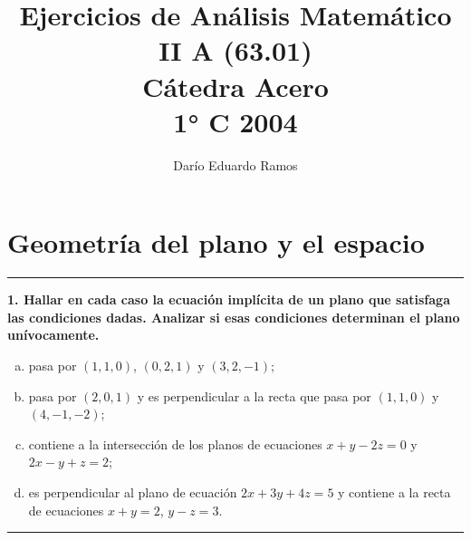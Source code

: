 \documentclass{article}
\title{Ejercicios de Análisis Matemático II A (63.01) \\ Cátedra Acero \\ 1° C 2004}
\author{Darío Eduardo Ramos}
\begin{document}
\maketitle

\tableofcontents{}
\newpage

\section{Geometría del plano y el espacio}

\hrule
\vspace{10 pt}

\textbf{1. Hallar en cada caso la ecuación implícita de un plano que satisfaga las condiciones dadas. Analizar si esas condiciones determinan el plano unívocamente.} 

\begin{enumerate}[(a)]
\bfseries
\item pasa por $(1, 1, 0)$, $(0, 2, 1)$ y $(3, 2, -1)$;

\item pasa por $(2, 0, 1)$ y es perpendicular a la recta que pasa por $(1, 1, 0)$ y $(4, -1, -2)$;

\item contiene a la intersección de los planos de ecuaciones $x + y - 2z = 0$ y $2x - y + z = 2$;

\item es perpendicular al plano de ecuación $2x + 3y + 4z = 5$ y contiene a la recta de ecuaciones $x + y = 2$, $y - z = 3$.
\end{enumerate}
\hrule
\end{document}
